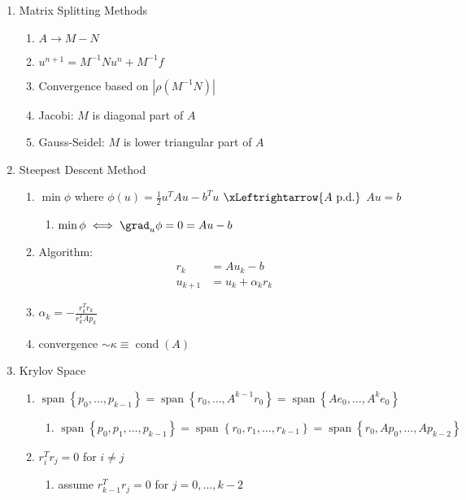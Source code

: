 \documentclass[10pt]{extarticle}
\DeclareMathOperator*{\cond}{cond}
\DeclareMathOperator*{\Span}{span}
\begin{document}
\begin{minipage}[t][0.5\textheight][t]{\textwidth}
\begin{multicols}{2}
\begin{enumerate}
	\item Matrix Splitting Methods
	\begin{enumerate}
		\item $A \to M - N$
		\item $u^{n+1} = M^{-1}Nu^n + M^{-1}f$
		\item Convergence based on $\left|\rho\left(M^{-1}N\right)\right|$
		\item Jacobi: $M$ is diagonal part of $A$
		\item Gauss-Seidel: $M$ is lower triangular part of $A$
	\end{enumerate}
	\item Steepest Descent Method
	\begin{enumerate}
		\item $\min\phi$ where $\phi(u)=\frac{1}{2}u^TAu-b^Tu$
			$\xLeftrightarrow{A \text{ p.d.}}$ $Au=b$
		\begin{enumerate}
			\item $\min\phi \iff \grad_u\phi=0=Au-b$
		\end{enumerate}
		\item Algorithm:
			\begin{align*}
				r_k &= Au_k - b \\
				u_{k+1} &= u_k + \alpha_k r_k
			\end{align*}
		\item $\alpha_k = -\frac{r_k^Tr_k}{r_k^TAp_k}$
		\item convergence $\sim \kappa \equiv \cond(A)$
	\end{enumerate}
	\item Krylov Space
	\begin{enumerate}
		\item $\Span\left\{p_0,\dots,p_{k-1}\right\}
			= \Span\left\{r_0,\dots,A^{k-1}r_0\right\}
			= \Span\left\{Ae_0,\dots,A^ke_0\right\}$
		\begin{enumerate}
			\item $\Span\left\{p_0,p_1,\dots,p_{k-1}\right\}
				= \Span\left\{r_0,r_1,\dots,r_{k-1}\right\}
				= \Span\left\{r_0,Ap_0,\dots,Ap_{k-2}\right\}$
		\end{enumerate}
		\item $r_i^Tr_j = 0$ for $i \neq j$
		\begin{enumerate}
			\item assume $r_{k-1}^Tr_j = 0$ for $j = 0,\dots,k-2$

\end{enumerate}
\end{enumerate}
\end{enumerate}
\end{multicols}
\end{minipage}
\end{document}
